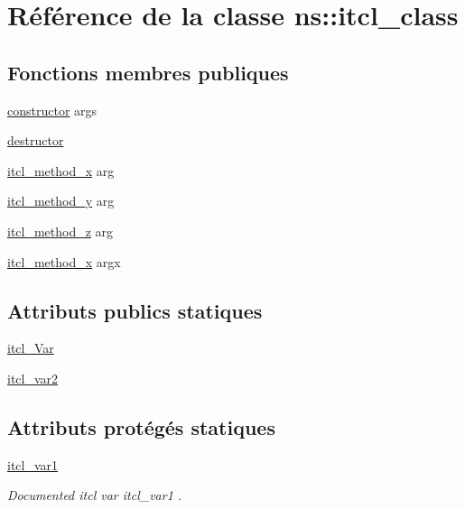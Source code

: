 \hypertarget{classns_1_1itcl__class}{}\section{Référence de la classe ns\+:\+:itcl\+\_\+class}
\label{classns_1_1itcl__class}
\subsection*{Fonctions membres publiques}
\begin{DoxyCompactItemize}
\item 
\hyperlink{classns_1_1itcl__class_a8ba2ba9d7bcb63b99a765e8f6003134b}{constructor} args
\item 
\hyperlink{classns_1_1itcl__class_ac72f3174993656391f9b54487aa4795e}{destructor}
\item 
\hyperlink{classns_1_1itcl__class_abc59160f823f3a6ec8c292c034aedbc3}{itcl\+\_\+method\+\_\+x} arg
\item 
\hyperlink{classns_1_1itcl__class_a092d0f8ed4796902e41fbeb1dfed82f1}{itcl\+\_\+method\+\_\+y} arg
\item 
\hyperlink{classns_1_1itcl__class_a13a383c766e489814960345540106cc1}{itcl\+\_\+method\+\_\+z} arg
\item 
\hyperlink{classns_1_1itcl__class_aad1f81467f2fca0dc02e527e786513a4}{itcl\+\_\+method\+\_\+x} argx
\end{DoxyCompactItemize}
\subsection*{Attributs publics statiques}
\begin{DoxyCompactItemize}
\item 
\hyperlink{classns_1_1itcl__class_a8df46696ce554fed04d170932260fbb8}{itcl\+\_\+\+Var}
\item 
\hyperlink{classns_1_1itcl__class_abaf3c744194c1b3ae68fb0ba70d8786e}{itcl\+\_\+var2}
\end{DoxyCompactItemize}
\subsection*{Attributs protégés statiques}
\begin{DoxyCompactItemize}
\item 
\hyperlink{classns_1_1itcl__class_ae515e43ca6bb755d116416f94a13d344}{itcl\+\_\+var1}
\begin{DoxyCompactList}\small\item\em Documented itcl var {\ttfamily itcl\+\_\+var1} . \end{DoxyCompactList}\end{DoxyCompactItemize}


